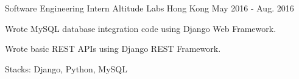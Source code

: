 \begin{cventries}
  \cventry
    {Software Engineering Intern} %
    {Altitude Labs} %
    {Hong Kong} %
    {May 2016 - Aug. 2016} %
    {
      \begin{cvitems} %
        \item {Wrote MySQL database integration code using Django Web Framework.}
        \item {Wrote basic REST APIs using Django REST Framework.}
        \item {Stacks: Django, Python, MySQL}
      \end{cvitems}
    }

\end{cventries}
